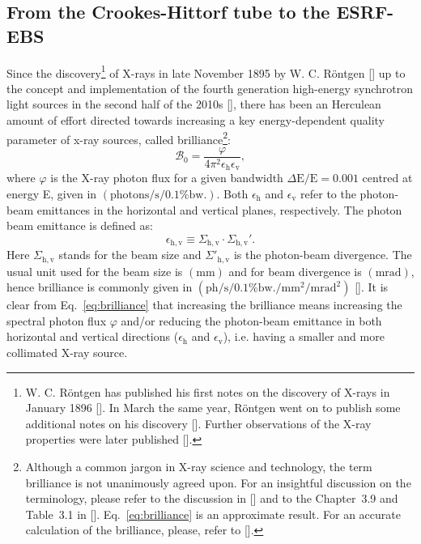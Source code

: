 \begin{refsection}
\section{From the Crookes-Hittorf tube to the ESRF-EBS}\label{sec:sources_intro}
Since the discovery\footnote{W. C. R\"{o}ntgen has published his first notes on the discovery of X-rays in January 1896 [\cite{Roentgen1896}]. In March the same year, R\"{o}ntgen went on to publish some additional notes on his discovery [\cite{Roentgen1896a}]. Further observations of the X-ray properties were later published [\cite{Roentgen1897}].} of X-rays in late November 1895 by W. C. R\"{o}ntgen [\cite{Roentgen1896}] up to the concept and implementation of the fourth generation high-energy synchrotron light sources in the second half of the 2010s [\cite{Eriksson2016}], there has been an Herculean amount of effort directed towards increasing a key energy-dependent quality parameter of x-ray sources, called brilliance\footnote{Although a common jargon in X-ray science and technology, the term brilliance is not unanimously agreed upon. For an insightful discussion on the terminology, please refer to the discussion in [\cite{Mills2005}] and to the Chapter~3.9 and Table~3.1 in [\cite{Talman2006}]. Eq.~\ref{eq:brilliance} is an approximate result. For an accurate calculation of the brilliance, please, refer to [\cite{Walker2019}].}:
\begin{equation}\label{eq:brilliance}
   \mathcal{B}_0 = \frac{\varphi}{4\pi^2\epsilon_\mathrm{h}\epsilon_\mathrm{v}},
\end{equation}{}
where $\varphi$ is the X-ray photon flux for a given bandwidth $\Delta\mathrm{E}/\mathrm{E}=0.001$ centred at energy E,  given in $(\mathrm{photons}/\mathrm{s}/0.1\%\mathrm{bw.})$. Both $\epsilon_\mathrm{h}$ and $\epsilon_\mathrm{v}$ refer to the photon-beam emittances in the horizontal and vertical planes, respectively. The photon beam emittance is defined as:
\begin{equation}
    \epsilon_{\mathrm{h,v}}\equiv\Sigma_{\mathrm{h,v}}\cdot\Sigma_{\mathrm{h,v}}'.
\end{equation}{}
Here $\Sigma_{\mathrm{h,v}}$ stands for the beam size and $\Sigma'_{\mathrm{h,v}}$ is the photon-beam divergence. The usual unit used for the beam size is $(\mathrm{mm})$ and for beam divergence is $(\mathrm{mrad})$, hence brilliance is commonly given in $(\mathrm{ph}/\mathrm{s}/0.1\%\mathrm{bw.}/\mathrm{mm}^2/\mathrm{mrad}^2)$ [\cite{Kim1986}]. It is clear from Eq.~\ref{eq:brilliance} that increasing the brilliance means increasing the spectral photon flux $\varphi$ and/or reducing the photon-beam emittance in both horizontal and vertical directions ($\epsilon_\mathrm{h}$ and $\epsilon_\mathrm{v}$), i.e. having a smaller and more collimated X-ray source.

\end{refsection}
